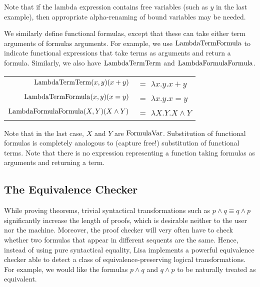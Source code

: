 Note that if the lambda expression contains free variables (such as $y$ in the last example), then appropriate alpha-renaming of bound variables may be needed.

We similarly define functional formulas, except that these can take either term arguments of formulas arguments. For example, we use $\operatorname{LambdaTermFormula}$ to indicate functional expressions that take terms as arguments and return a formula. Similarly, we also have $\operatorname{LambdaTermTerm}$ and $\operatorname{LambdaFormulaFormula}$.

\begin{example}
  \begin{center}
    \begin{tabular}{|r l|}
      \hline
      \rule{0em}{1.3em}
      $\operatorname{LambdaTermTerm}(x, y)(x+y)$       & $=$ $\lambda x.y. x+y$       \\
      $\operatorname{LambdaTermFormula}(x, y)(x=y)$       & $=$ $\lambda x.y. x=y$       \\
      $\operatorname{LambdaFormulaFormula}(X, Y)(X \land Y)$ & $=$ $\lambda X.Y. X \land Y$
      \rule[-1em]{0em}{0em}                                       \\
      \hline
    \end{tabular}
  \end{center}

\end{example}

Note that in the last case, $X$ and $Y$ are $\operatorname{FormulaVar}$. Substitution of functional formulas is completely analogous to (capture free!) substitution of functional terms. Note that there is no expression representing a function taking formulas as arguments and returning a term.

\subsection{The Equivalence Checker}
\label{subsec:equivalencechecker}

While proving theorems, trivial syntactical transformations such as $p\land q \equiv q\land p$ significantly increase the length of proofs, which is desirable neither to the user nor the machine. Moreover, the proof checker will very often have to check whether two formulas that appear in different sequents are the same. Hence, instead of using pure syntactical equality, Lisa implements a powerful equivalence checker able to detect a class of equivalence-preserving logical transformations. For example, we would like the  formulas $p\land q$ and $q\land p$ to be naturally treated as equivalent.

